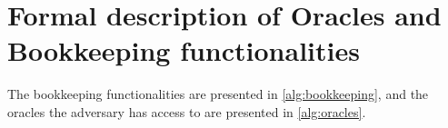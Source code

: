 \section{Formal description of Oracles and Bookkeeping functionalities} \label{app:bookkeeping}


The bookkeeping functionalities are presented in \autoref{alg:bookkeeping}, and the oracles the adversary has access to are presented in \autoref{alg:oracles}.


